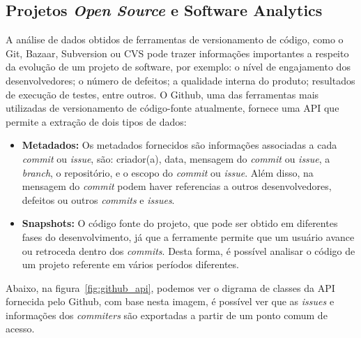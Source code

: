 \subsection{Projetos \textit{Open Source} e Software Analytics}

A análise de dados obtidos de ferramentas de versionamento de código, como o Git, Bazaar, Subversion ou CVS pode trazer informações importantes a respeito da evolução de um projeto de software, por exemplo: o nível de engajamento dos desenvolvedores; o número de defeitos; a qualidade interna do produto; resultados de execução de testes, entre outros\cite{artAndScience}. O Github, uma das ferramentas mais utilizadas de versionamento de código-fonte atualmente, fornece uma API que permite a extração de dois tipos de dados:

\begin{itemize}
    \item \textbf{Metadados:} Os metadados fornecidos são informações associadas a cada \textit{commit} ou \textit{issue}, são: criador(a), data, mensagem do \textit{commit} ou \textit{issue}, a \textit{branch}, o repositório, e o escopo do \textit{commit} ou \textit{issue}. Além disso, na mensagem do \textit{commit} podem haver referencias a outros desenvolvedores, defeitos ou outros \textit{commits} e \textit{issues}.
    \item \textbf{Snapshots:} O código fonte do projeto, que pode ser obtido em diferentes fases do desenvolvimento, já que a ferramente permite que um usuário avance ou retroceda dentro dos \textit{commits}. Desta forma, é possível analisar o código de um projeto referente em vários períodos diferentes.
\end{itemize}

Abaixo, na figura~\ref{fig:github_api}, podemos ver o digrama de classes da API fornecida pelo Github, com base nesta imagem, é possível ver que as \textit{issues} e informações dos \textit{commiters} são exportadas a partir de um ponto comum de acesso.

